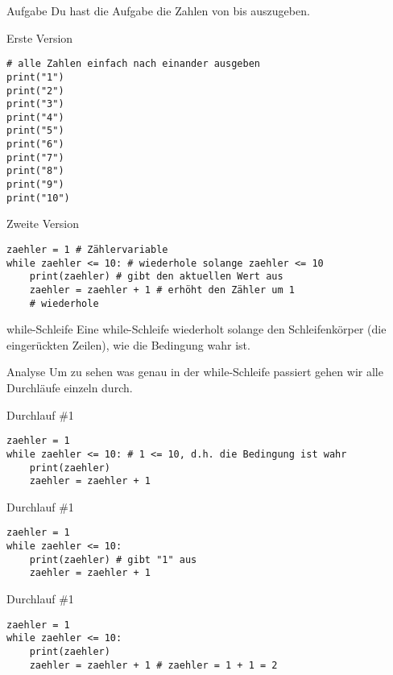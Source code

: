 \documentclass{\VorlagenPfad/coderdojokabeamer}
\newcommand{\code}[1]{{\ttfamily #1}}
\begin{document}
\begin{frame}{Aufgabe}
Du hast die Aufgabe die Zahlen von \code{1} bis \code{10} auszugeben.
\end{frame}

\begin{frame}[fragile]{Erste Version}
	\begin{verbatim}
# alle Zahlen einfach nach einander ausgeben
print("1")
print("2")
print("3")
print("4")
print("5")
print("6")
print("7")
print("8")
print("9")
print("10")
	\end{verbatim}
\end{frame}


\begin{frame}[fragile]{Zweite Version}
	\begin{verbatim}
zaehler = 1 # Zählervariable
while zaehler <= 10: # wiederhole solange zaehler <= 10
	print(zaehler) # gibt den aktuellen Wert aus
	zaehler = zaehler + 1 # erhöht den Zähler um 1
	# wiederhole
	\end{verbatim}
\end{frame}

\begin{frame}{while-Schleife}
Eine \code{while}-Schleife wiederholt solange den Schleifenkörper (die eingerückten Zeilen), wie die Bedingung wahr ist.
\end{frame}
	
\begin{frame}{Analyse}
Um zu sehen was genau in der \code{while}-Schleife passiert gehen wir alle Durchläufe einzeln durch.
\end{frame}



\begin{frame}[fragile]{Durchlauf \#1}
	\begin{verbatim}
zaehler = 1
while zaehler <= 10: # 1 <= 10, d.h. die Bedingung ist wahr
	print(zaehler)
	zaehler = zaehler + 1
	\end{verbatim}
\end{frame}

\begin{frame}[fragile]{Durchlauf \#1}
	\begin{verbatim}
zaehler = 1
while zaehler <= 10:
	print(zaehler) # gibt "1" aus
	zaehler = zaehler + 1
	\end{verbatim}
\end{frame}

\begin{frame}[fragile]{Durchlauf \#1}
	\begin{verbatim}
zaehler = 1
while zaehler <= 10:
	print(zaehler)
	zaehler = zaehler + 1 # zaehler = 1 + 1 = 2
	\end{verbatim}
\end{frame}
\end{document}
